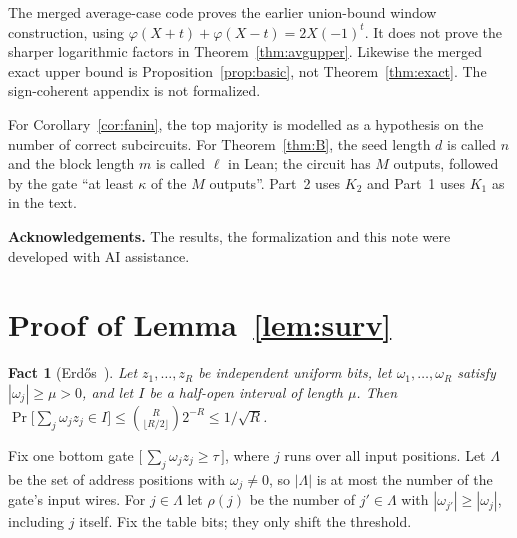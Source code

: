 \documentclass[11pt,letterpaper]{article}
\newtheorem{fact}[theorem]{Fact}
\theoremstyle{remark}
\newcommand{\ind}[1]{\bigl[\,#1\,\bigr]}
\newcommand{\sect}[1]{\section{\texorpdfstring{\color{ink}#1}{#1}}}
\newcommand{\smalltitle}[1]{\textbf{\color{ink}#1}\quad}
\begin{document}
The merged average-case code proves the earlier union-bound window
construction, using $\varphi(X+t)+\varphi(X-t)=2X(-1)^t$. It does not prove
the sharper logarithmic factors in Theorem~\ref{thm:avgupper}. Likewise the
merged exact upper bound is Proposition~\ref{prop:basic}, not
Theorem~\ref{thm:exact}. The sign-coherent appendix is not formalized.

For Corollary~\ref{cor:fanin}, the top majority is modelled as a hypothesis
on the number of correct subcircuits. For Theorem~\ref{thm:B}, the seed
length $d$ is called $n$ and the block length $m$ is called $\ell$ in Lean;
the circuit has $M$ outputs, followed by the gate ``at least $\kappa$ of the
$M$ outputs''. Part~2 uses $K_2$ and Part~1 uses $K_1$ as in the text.

\smalltitle{Acknowledgements.}
The results, the formalization and this note were developed with AI
assistance.

\appendix
\renewcommand{\thesection}{\Alph{section}}
\sect{Proof of Lemma~\ref{lem:surv}}\label{app:surv}

\begin{fact}[Erd\H{o}s~\cite{Erdos}]\label{fact:lo}
Let $z_1,\dots,z_R$ be independent uniform bits, let $\omega_1,\dots,\omega_R$
satisfy $|\omega_j|\ge\mu>0$, and let $I$ be a half-open interval of length
$\mu$. Then
$\Pr\bigl[\sum_j\omega_jz_j\in I\bigr]\le\binom{R}{\lfloor R/2\rfloor}2^{-R}\le1/\sqrt R$.
\end{fact}

Fix one bottom gate $\ind{\sum_j\omega_jz_j\ge\tau}$, where $j$ runs over
all input positions. Let $\Lambda$ be the set of address positions with
$\omega_j\ne0$, so $|\Lambda|$ is at most the number of the gate's input wires.
For $j\in \Lambda$ let $\rho(j)$ be the number of $j'\in \Lambda$ with
$|\omega_{j'}|\ge|\omega_j|$, including $j$ itself. Fix the table bits; they
only shift the threshold.
\end{document}
